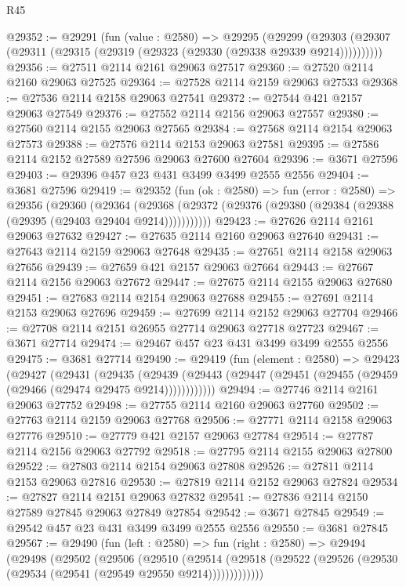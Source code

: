 \begin{lexlean}{R45}
\begin{coremodule}
@29352 := @29291
    (fun (value : @2580) =>
    @29295
      (@29299 (@29303 (@29307 (@29311 (@29315 (@29319 (@29323 (@29330 (@29338 @29339 @9214))))))))))
@29356 := @27511 @2114 @2161 @29063 @27517
@29360 := @27520 @2114 @2160 @29063 @27525
@29364 := @27528 @2114 @2159 @29063 @27533
@29368 := @27536 @2114 @2158 @29063 @27541
@29372 := @27544 @421 @2157 @29063 @27549
@29376 := @27552 @2114 @2156 @29063 @27557
@29380 := @27560 @2114 @2155 @29063 @27565
@29384 := @27568 @2114 @2154 @29063 @27573
@29388 := @27576 @2114 @2153 @29063 @27581
@29395 := @27586 @2114 @2152 @27589 @27596 @29063 @27600 @27604
@29396 := @3671 @27596
@29403 := @29396 @457 @23 @431 @3499 @3499 @2555 @2556
@29404 := @3681 @27596
@29419 := @29352
    (fun (ok : @2580) =>
    fun (error : @2580) =>
    @29356
      (@29360
        (@29364
          (@29368 (@29372 (@29376 (@29380 (@29384 (@29388 (@29395 (@29403 @29404 @9214)))))))))))
@29423 := @27626 @2114 @2161 @29063 @27632
@29427 := @27635 @2114 @2160 @29063 @27640
@29431 := @27643 @2114 @2159 @29063 @27648
@29435 := @27651 @2114 @2158 @29063 @27656
@29439 := @27659 @421 @2157 @29063 @27664
@29443 := @27667 @2114 @2156 @29063 @27672
@29447 := @27675 @2114 @2155 @29063 @27680
@29451 := @27683 @2114 @2154 @29063 @27688
@29455 := @27691 @2114 @2153 @29063 @27696
@29459 := @27699 @2114 @2152 @29063 @27704
@29466 := @27708 @2114 @2151 @26955 @27714 @29063 @27718 @27723
@29467 := @3671 @27714
@29474 := @29467 @457 @23 @431 @3499 @3499 @2555 @2556
@29475 := @3681 @27714
@29490 := @29419
    (fun (element : @2580) =>
    @29423
      (@29427
        (@29431
          (@29435
            (@29439 (@29443 (@29447 (@29451 (@29455 (@29459 (@29466 (@29474 @29475 @9214))))))))))))
@29494 := @27746 @2114 @2161 @29063 @27752
@29498 := @27755 @2114 @2160 @29063 @27760
@29502 := @27763 @2114 @2159 @29063 @27768
@29506 := @27771 @2114 @2158 @29063 @27776
@29510 := @27779 @421 @2157 @29063 @27784
@29514 := @27787 @2114 @2156 @29063 @27792
@29518 := @27795 @2114 @2155 @29063 @27800
@29522 := @27803 @2114 @2154 @29063 @27808
@29526 := @27811 @2114 @2153 @29063 @27816
@29530 := @27819 @2114 @2152 @29063 @27824
@29534 := @27827 @2114 @2151 @29063 @27832
@29541 := @27836 @2114 @2150 @27589 @27845 @29063 @27849 @27854
@29542 := @3671 @27845
@29549 := @29542 @457 @23 @431 @3499 @3499 @2555 @2556
@29550 := @3681 @27845
@29567 := @29490
    (fun (left : @2580) =>
    fun (right : @2580) =>
    @29494
      (@29498
        (@29502
          (@29506
            (@29510
              (@29514
                (@29518 (@29522 (@29526 (@29530 (@29534 (@29541 (@29549 @29550 @9214)))))))))))))

\end{coremodule}
\end{lexlean}
